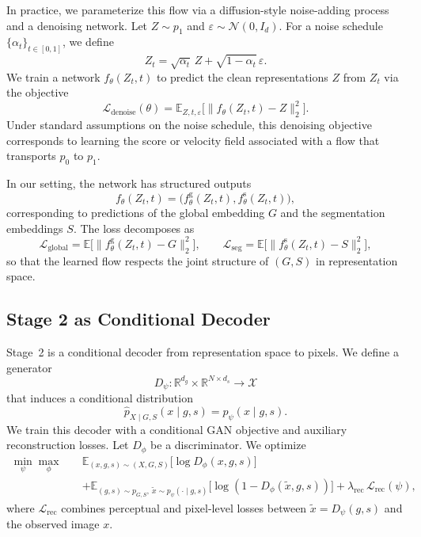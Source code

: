 \documentclass[12pt]{article}
\begin{document}
In practice, we parameterize this flow via a diffusion-style noise-adding
process and a denoising network.
Let \(Z \sim p_1\) and \(\varepsilon \sim \mathcal{N}(0, I_d)\).
For a noise schedule \(\{\alpha_t\}_{t \in [0,1]}\), we define
\[
Z_t = \sqrt{\alpha_t}\, Z + \sqrt{1 - \alpha_t}\,\varepsilon.
\]
We train a network \(f_\theta(Z_t, t)\) to predict the clean
representations \(Z\) from \(Z_t\) via the objective
\[
\mathcal{L}_{\mathrm{denoise}}(\theta)
= \mathbb{E}_{Z, t, \varepsilon}
\big[\|f_\theta(Z_t, t) - Z\|_2^2\big].
\]
Under standard assumptions on the noise schedule,
this denoising objective corresponds to learning the score or velocity
field associated with a flow that transports \(p_0\) to \(p_1\).

In our setting, the network has structured outputs
\[
f_\theta(Z_t, t)
= \big(f_\theta^{\mathrm{g}}(Z_t, t), f_\theta^{\mathrm{s}}(Z_t, t)\big),
\]
corresponding to predictions of the global embedding \(G\) and the
segmentation embeddings \(S\).
The loss decomposes as
\[
\mathcal{L}_{\mathrm{global}}
= \mathbb{E}\big[\|f_\theta^{\mathrm{g}}(Z_t, t) - G\|_2^2\big], \qquad
\mathcal{L}_{\mathrm{seg}}
= \mathbb{E}\big[\|f_\theta^{\mathrm{s}}(Z_t, t) - S\|_2^2\big],
\]
so that the learned flow respects the joint structure of
\((G,S)\) in representation space.

\subsection{Stage 2 as Conditional Decoder}

Stage~2 is a conditional decoder from representation space to pixels.
We define a generator
\[
D_\psi : \mathbb{R}^{d_g} \times \mathbb{R}^{N \times d_s} \to \mathcal{X}
\]
that induces a conditional distribution
\[
\hat{p}_{X \mid G,S}(x \mid g,s) = p_\psi(x \mid g,s).
\]
We train this decoder with a conditional GAN objective and auxiliary
reconstruction losses.
Let \(D_\phi\) be a discriminator.
We optimize
\begin{align*}
\min_\psi \max_\phi \quad
&\mathbb{E}_{(x,g,s) \sim (X,G,S)}
\big[\log D_\phi(x,g,s)\big] \\
&+ \mathbb{E}_{(g,s) \sim p_{G,S},
\ \tilde{x} \sim p_\psi(\cdot \mid g,s)}
\big[\log(1 - D_\phi(\tilde{x}, g,s))\big]
+ \lambda_{\mathrm{rec}}\,\mathcal{L}_{\mathrm{rec}}(\psi),
\end{align*}
where \(\mathcal{L}_{\mathrm{rec}}\) combines perceptual and pixel-level losses
between \(\tilde{x} = D_\psi(g,s)\) and the observed image \(x\).
\end{document}
